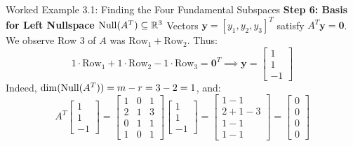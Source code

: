 \begin{examplebox}{Worked Example 3.1: Finding the Four Fundamental Subspaces}
\textbf{Step 6: Basis for Left Nullspace $\operatorname{Null}(A^T) \subseteq \mathbb{R}^3$}
Vectors $\mathbf{y} = [y_1, y_2, y_3]^T$ satisfy $A^T \mathbf{y} = \mathbf{0}$. We observe Row 3 of $A$ was $\text{Row}_1 + \text{Row}_2$. Thus:
\begin{equation*}
1 \cdot \text{Row}_1 + 1 \cdot \text{Row}_2 - 1 \cdot \text{Row}_3 = \mathbf{0}^T \implies \mathbf{y} = \begin{bmatrix} 1 \\ 1 \\ -1 \end{bmatrix}
\end{equation*}
Indeed, $\dim(\operatorname{Null}(A^T)) = m - r = 3 - 2 = 1$, and:
\begin{equation*}
A^T \begin{bmatrix} 1 \\ 1 \\ -1 \end{bmatrix} = \begin{bmatrix} 1 & 0 & 1 \\ 2 & 1 & 3 \\ 0 & 1 & 1 \\ 1 & 0 & 1 \end{bmatrix} \begin{bmatrix} 1 \\ 1 \\ -1 \end{bmatrix} = \begin{bmatrix} 1 - 1 \\ 2 + 1 - 3 \\ 1 - 1 \\ 1 - 1 \end{bmatrix} = \begin{bmatrix} 0 \\ 0 \\ 0 \\ 0 \end{bmatrix}
\end{equation*}


\end{examplebox}
